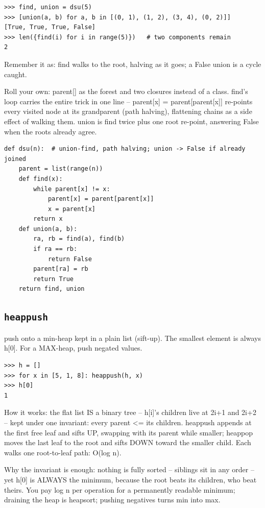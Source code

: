 \documentclass[10pt,letterpaper]{book}
\begin{document}
\begin{lstlisting}[style=ex]
>>> find, union = dsu(5)
>>> [union(a, b) for a, b in [(0, 1), (1, 2), (3, 4), (0, 2)]]
[True, True, True, False]
>>> len({find(i) for i in range(5)})   # two components remain
2
\end{lstlisting}

Remember it as: find walks to the root, halving as it goes; a False union is a cycle caught.


Roll your own: parent[] as the forest and two closures instead of a class. find's loop carries the entire trick in one line -- parent[x] = parent[parent[x]] re-points every visited node at its grandparent (path halving), flattening chains as a side effect of walking them. union is find twice plus one root re-point, answering False when the roots already agree.

\begin{lstlisting}[style=ex]
def dsu(n):  # union-find, path halving; union -> False if already joined
    parent = list(range(n))
    def find(x):
        while parent[x] != x:
            parent[x] = parent[parent[x]]
            x = parent[x]
        return x
    def union(a, b):
        ra, rb = find(a), find(b)
        if ra == rb:
            return False
        parent[ra] = rb
        return True
    return find, union
\end{lstlisting}
\subsection{\texttt{heappush}}\label{def:heappush}
push onto a min-heap kept in a plain list (sift-up). The smallest element is always h[0]. For a MAX-heap, push negated values.
\begin{lstlisting}[style=ex]
>>> h = []
>>> for x in [5, 1, 8]: heappush(h, x)
>>> h[0]
1
\end{lstlisting}

How it works: the flat list IS a binary tree -- h[i]'s children live at 2i+1 and 2i+2 -- kept under one invariant: every parent <= its children. heappush appends at the first free leaf and sifts UP, swapping with its parent while smaller; heappop moves the last leaf to the root and sifts DOWN toward the smaller child. Each walks one root-to-leaf path: O(log n).


Why the invariant is enough: nothing is fully sorted -- siblings sit in any order -- yet h[0] is ALWAYS the minimum, because the root beats its children, who beat theirs. You pay log n per operation for a permanently readable minimum; draining the heap is heapsort; pushing negatives turns min into max.
\end{document}
